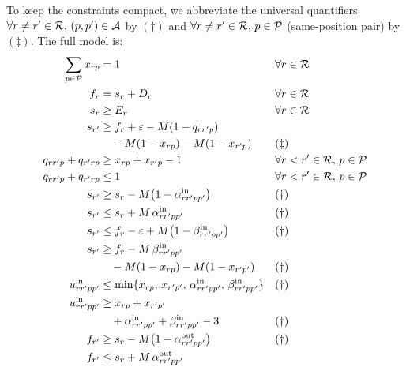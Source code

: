 To keep the constraints compact, we abbreviate the universal quantifiers
$\forall r \ne r' \in \mathcal{R},\, (p, p') \in \mathcal{A}$ by $(\dagger)$ and
$\forall r \ne r' \in \mathcal{R},\, p \in \mathcal{P}$ (same-position pair) by
$(\ddagger)$.  The full model is:
\begin{align}
  \sum_{p \in \calP} x_{rp} &= 1
    && \forall r \in \calR \label{eq:assign}\\
  f_r &= s_r + D_r
    && \forall r \in \calR \label{eq:dur}\\
  s_r &\ge E_r
    && \forall r \in \calR \label{eq:earlystart}\\
  s_{r'} &\ge f_r + \varepsilon
              - M(1 - q_{rr'p}) \notag\\
         &\quad - M(1 - x_{rp}) - M(1 - x_{r'p})
    && (\ddagger) \label{eq:sep}\\
  q_{rr'p} + q_{r'rp} &\ge x_{rp} + x_{r'p} - 1
    && \forall r < r' \in \calR,\, p \in \calP \label{eq:ordLB}\\
  q_{rr'p} + q_{r'rp} &\le 1
    && \forall r < r' \in \calR,\, p \in \calP \label{eq:ordUB}\\
  s_{r'} &\ge s_r - M\bigl(1 - \alpha^{\mathrm{in}}_{rr'pp'}\bigr)
    && (\dagger) \label{eq:alphaInLB}\\
  s_{r'} &\le s_r + M\,\alpha^{\mathrm{in}}_{rr'pp'}
    && (\dagger) \label{eq:alphaInUB}\\
  s_{r'} &\le f_r - \varepsilon
              + M\bigl(1 - \beta^{\mathrm{in}}_{rr'pp'}\bigr)
    && (\dagger) \label{eq:betaInUB}\\
  s_{r'} &\ge f_r - M\,\beta^{\mathrm{in}}_{rr'pp'} \notag\\
         &\quad - M(1 - x_{rp}) - M(1 - x_{r'p'})
    && (\dagger) \label{eq:betaInLB}\\
  u^{\mathrm{in}}_{rr'pp'} &\le \min\{x_{rp},\, x_{r'p'},\,
                                   \alpha^{\mathrm{in}}_{rr'pp'},\,
                                   \beta^{\mathrm{in}}_{rr'pp'}\}
    && (\dagger) \label{eq:uInUB}\\
  u^{\mathrm{in}}_{rr'pp'} &\ge x_{rp} + x_{r'p'} \notag\\
                           &\quad + \alpha^{\mathrm{in}}_{rr'pp'}
                           + \beta^{\mathrm{in}}_{rr'pp'} - 3
    && (\dagger) \label{eq:uInLB}\\
  f_{r'} &\ge s_r - M\bigl(1 - \alpha^{\mathrm{out}}_{rr'pp'}\bigr)
    && (\dagger) \label{eq:alphaOutLB}\\
  f_{r'} &\le s_r + M\,\alpha^{\mathrm{out}}_{rr'pp'}

\end{align}
